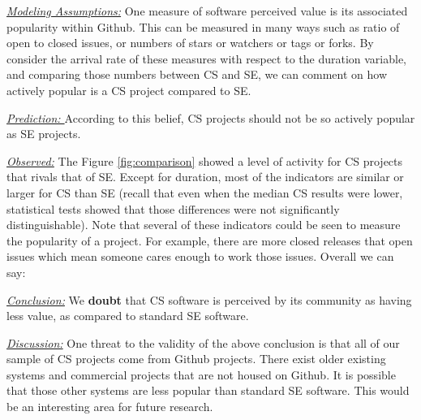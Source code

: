 \documentclass[sigconf,review,anonymous]{acmart}
\newenvironment{RQ}{\vspace{1mm}\begin{tcolorbox}[enhanced,width=3.4in,size=fbox,colback=red!5!white,drop shadow southeast,sharp corners]}{\end{tcolorbox}}
\begin{document}
\noindent \textit{\underline{Modeling Assumptions:}} 
One measure of software perceived value is its associated popularity within Github. This can be measured in many ways such as ratio of open to closed issues, or
numbers of stars or watchers or tags or forks. By consider the arrival rate of these measures with respect to the duration variable, and comparing those numbers between CS and SE, we can comment on how actively popular is a CS project compared to SE.

\noindent \textit{\underline{Prediction: }} 
According to this belief, CS projects should not be so actively popular as SE projects.



\noindent \textit{\underline{Observed:}} 
The Figure \ref{fig:comparison} showed a
level of activity for CS projects that rivals that of SE.
Except for duration, most of the indicators are similar or larger for CS than SE
(recall that even when the median CS results were lower, statistical tests showed that those differences
were not significantly distinguishable). Note that several of these indicators could be seen
to measure the popularity of a project. For example,
there are more closed releases that open issues which mean someone cares enough to work those issues.
Overall we can say:


\begin{RQ}
\textit{\underline{Conclusion:}} 
We  \textbf{doubt} that CS software is perceived by its community as having less value,
as compared to standard SE software.
\end{RQ}

\noindent \textit{\underline{Discussion:}} 
One threat to the validity of the above conclusion is that all of our sample of CS projects come from Github projects.
 There exist older existing systems and commercial projects that are not housed on Github. It is possible that those other systems are less popular than standard SE software. This would be an interesting area for future research.
  
\end{document}
